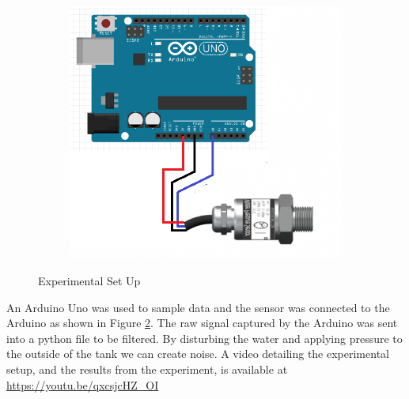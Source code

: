 \documentclass{article}
\begin{document}
\begin{figure}[H]
\centering
\begin{subfigure}{.5\textwidth}
  \centering
  
  \caption{}
  \label{fig:a}
\end{subfigure}%
\begin{subfigure}{.5\textwidth}
  \centering
  \includegraphics[scale=0.45]{pressureCircuit}
  \caption{}
  \label{fig:b}
\end{subfigure}
\caption{Experimental Set Up}
\label{fig:setUp}
\end{figure}
An Arduino Uno was used to sample data and the sensor was connected to the Arduino as shown in Figure \ref{fig:b}. The raw signal captured by the Arduino was sent into a python file to be filtered.
By disturbing the water and applying pressure to the outside of the tank we can create noise. A video detailing the experimental setup, and the results from the experiment, is available at \url{https://youtu.be/qxcsjcHZ_OI}
 
\end{document}
